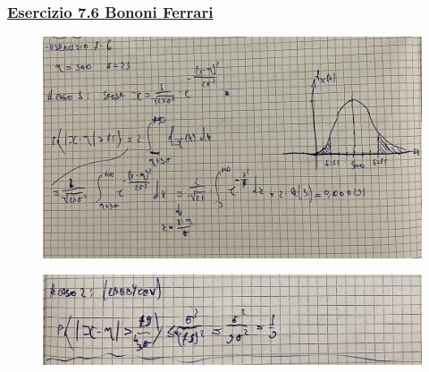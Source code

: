 \documentclass{article}
\begin{document}
\subsubsection{\underline{Esercizio 7.6 Bononi Ferrari}}
\begin{figure}[ht]
\centering
\includegraphics[scale=0.10]{ese/37.jpeg}
\end{figure}
\begin{figure}[ht]
\centering
\includegraphics[scale=0.10]{ese/37a.jpeg}
\end{figure}
\end{document}
